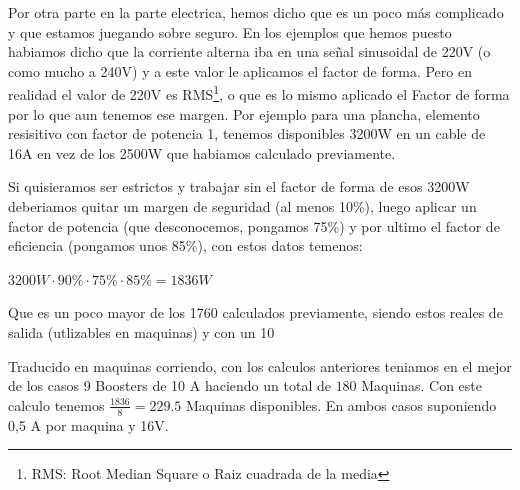 Por otra parte en la parte electrica, hemos dicho que es un poco más complicado y que estamos juegando sobre seguro. En los ejemplos que hemos puesto habiamos dicho que la corriente alterna iba en una señal sinusoidal de 220V (o como mucho a 240V) y a este valor le aplicamos el factor de forma. Pero en realidad el valor de 220V es RMS\footnote{RMS: Root Median Square o Raiz cuadrada de la media}, o que es lo mismo aplicado el Factor de forma por lo que aun tenemos ese margen. Por ejemplo para una plancha, elemento resisitivo con factor de potencia 1, tenemos disponibles 3200W en un cable de 16A en vez de los 2500W que habiamos calculado previamente. 

Si quisieramos ser estrictos y trabajar sin el factor de forma de esos 3200W deberiamos quitar un margen de seguridad (al menos 10\%), luego aplicar un factor de potencia (que desconocemos, pongamos 75\%) y por ultimo el factor de eficiencia (pongamos unos 85\%), con estos datos temenos:

$3200W \cdot 90\% \cdot 75\% \cdot 85\% = 1836W $

Que es un poco mayor de los 1760 calculados previamente, siendo estos reales de salida (utlizables en maquinas) y con un 10%

Traducido en maquinas corriendo, con los calculos anteriores teniamos en el mejor de los casos 9 Boosters de 10 A haciendo un total de $180$ Maquinas.
Con este calculo tenemos $\frac{1836}{8}=229.5$ Maquinas disponibles. En ambos casos suponiendo 0,5 A por maquina y 16V.

